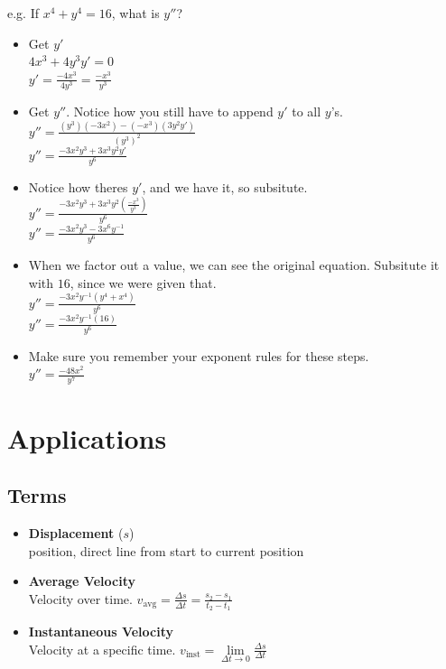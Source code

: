 \documentclass[a4paper,12pt]{article}
\begin{document}
e.g. If $x^4 + y^4 = 16$, what is $y''$?
\begin{itemize}
    \item{
        Get $y'$\\
        $4x^3 + 4y^3y' = 0$\\
        $y' = \frac{-4x^3}{4y^3} = \frac{-x^3}{y^3}$
    }
    \item{
            Get $y''$. Notice how you still have to append $y'$ to all $y$'s.\\
            $y'' = \frac{(y^3)(-3x^2) - (-x^3)(3y^2y')}{(y^3)^2}$\\
            $y'' = \frac{-3x^2y^3 + 3x^3y^2y'}{y^6}$
        }
    \item{
            Notice how theres $y'$, and we have it, so subsitute.\\
            $y'' = \frac{-3x^2y^3 + 3x^3y^2(\frac{-x^3}{y^3})}{y^6}$\\
            $y'' = \frac{-3x^2y^3 - 3x^6y^{-1}}{y^6}$
        }
    \item{
            When we factor out a value, we can see the original equation. Subsitute it with $16$, since we were given that.\\
            $y'' = \frac{-3x^2y^{-1}(y^4 + x^4)}{y^6}$\\
            $y'' = \frac{-3x^2y^{-1}(16)}{y^6}$
        }
    \item{
            Make sure you remember your exponent rules for these steps.\\
            $y'' = \frac{-48x^2}{y^7}$
        }
\end{itemize}

\pagebreak

\section{Applications}
\subsection{Terms}
\begin{itemize}
    \item{\textbf{Displacement} ($s$)\\position, direct line from start to current position}
    \item{\textbf{Average Velocity}\\Velocity over time. $v_{\textrm{avg}} = \frac{\Delta{s}}{\Delta{t}} = \frac{s_2 - s_1}{t_2 - t_1}$}
    \item{\textbf{Instantaneous Velocity}\\Velocity at a specific time. $v_\textrm{inst} = \lim\limits_{\Delta{t}\to0}{\frac{\Delta{s}}{\Delta{t}}}$}
\end{itemize}
\end{document}
